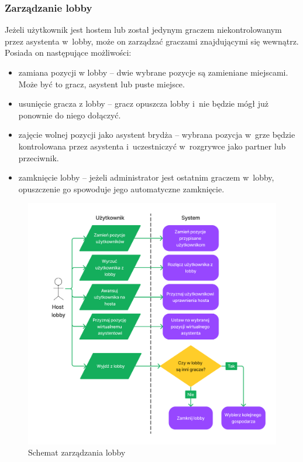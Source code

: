 \FloatBarrier

\subsubsection{Zarządzanie lobby}

Jeżeli użytkownik jest hostem lub został jedynym
graczem niekontrolowanym przez asystenta w~lobby, może on zarządzać graczami
znajdującymi się
wewnątrz. Posiada on następujące możliwości:
\begin{itemize}
  \item zamiana pozycji w lobby -- dwie wybrane pozycje są zamieniane miejscami.
        Może być to gracz, asystent lub puste miejsce.
  \item usunięcie gracza z lobby -- gracz opuszcza lobby i~nie będzie
        mógł już ponownie do niego dołączyć.
  \item zajęcie wolnej pozycji jako asystent brydża -- wybrana pozycja
        w~grze będzie kontrolowana przez asystenta
        i~uczestniczyć w~rozgrywce jako partner lub przeciwnik.
  \item zamknięcie lobby -- jeżeli administrator jest ostatnim
        graczem w~lobby, opuszczenie go spowoduje jego automatyczne
        zamknięcie.

\end{itemize}

\begin{figure}[h]
  \centering
  \includegraphics[width=\textwidth]{img/schematy/manage_lobby.png}
  \caption{Schemat zarządzania lobby}
\end{figure}


